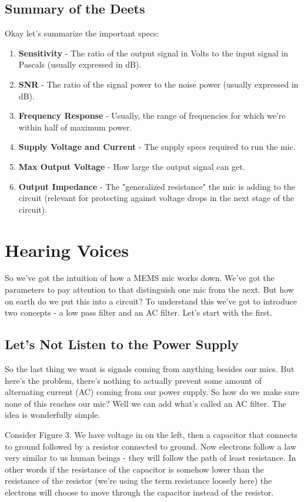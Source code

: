 \documentclass[10pt,a5paper]{book}
\begin{document}
\subsection{Summary of the Deets}
Okay let's summarize the important specs:
\begin{enumerate}
\item \textbf{Sensitivity} - The ratio of the output signal in Volts to the input signal in Pascals (usually expressed in dB).
\item \textbf{SNR} - The ratio of the signal power to the noise power (usually expressed in dB). 
\item \textbf{Frequency Response} - Usually, the range of frequencies for which we're within half of maximum power. 
\item \textbf{Supply Voltage and Current} - The supply specs required to run the mic.
\item \textbf{Max Output Voltage} - How large the output signal can get.
\item \textbf{Output Impedance} - The "generalized resistance" the mic is adding to the circuit (relevant for protecting against voltage drops in the next stage of the circuit).
\end{enumerate}
\section{Hearing Voices}
So we've got the intuition of how a MEMS mic works down. We've got the parameters to pay attention to that distinguish one mic from the next. But how on earth do we put this into a circuit? To understand this we've got to introduce two concepts - a low pass filter and an AC filter. Let's start with the first. 

\subsection{Let's Not Listen to the Power Supply}
So the last thing we want is signals coming from anything besides our mics. But here's the problem, there's nothing to actually prevent some amount of alternating current (AC) coming from our power supply. So how do we make sure none of this reaches our mic? Well we can add what's called an AC filter. The idea is wonderfully simple. 

Consider Figure 3. We have voltage in on the left, then a capacitor that connects to ground followed by a resistor connected to ground. Now electrons follow a law very similar to us human beings - they will follow the path of least resistance. In other words if the resistance of the capacitor is somehow lower than the resistance of the resistor (we're using the term resistance loosely here) the electrons will choose to move through the capacitor instead of the resistor. 
\end{document}
